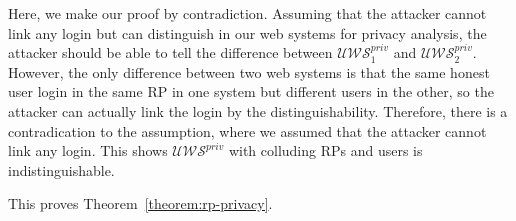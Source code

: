   Here, we make our proof by contradiction.
  Assuming that the attacker cannot link any login but can 
  distinguish in our web systems for privacy analysis, 
  the attacker should be able to tell the difference between 
  $\mathcal{U\!W\!S}^{priv}_1$ and $\mathcal{U\!W\!S}^{priv}_2$.
  However, the only difference between two web systems is that 
  the same honest user login in the same RP in one system but 
  different users in the other, so the attacker can actually 
  link the login by the distinguishability. Therefore, there is 
  a contradication to the assumption, where we assumed that the 
  attacker cannot link any login. This shows $\mathcal{U\!W\!S}^{priv}$ 
  with colluding RPs and users is indistinguishable.

  This proves Theorem~\ref{theorem:rp-privacy}.\QED
  

